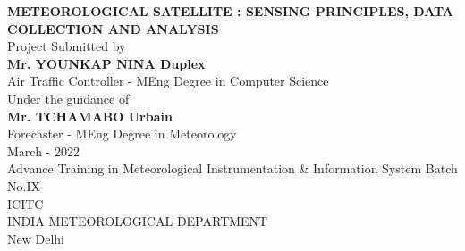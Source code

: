 \documentclass[a4papert,12pt]{report}%
\begin{document}
\begin{center}
	\Large \textbf{ METEOROLOGICAL SATELLITE : SENSING PRINCIPLES, DATA COLLECTION AND ANALYSIS} \vspace{ 1.5 \baselineskip} \normalsize \\	
	
	\Large Project Submitted by \vspace{1 \baselineskip} \normalsize \\
	
	\Large \textbf{ Mr. YOUNKAP NINA Duplex} \vspace{ 0.1\baselineskip} \normalsize \\
	\Large Air Traffic Controller - MEng Degree in Computer Science \vspace{ 1.5 \baselineskip} \normalsize \\
	
	\Large Under the guidance of \vspace{ 1 \baselineskip} \normalsize\\
	\Large \textbf{ Mr. TCHAMABO Urbain }\vspace{ 0.1\baselineskip} \normalsize \\
	\Large Forecaster - MEng Degree in Meteorology \vspace{ 1.5 \baselineskip} \normalsize \\
	
	\Large March - 2022 \vspace{ 1.5 \baselineskip} \normalsize \\
	
	\Large Advance Training in Meteorological Instrumentation \& Information System Batch No.IX \vspace{ 1.5 \baselineskip} \normalsize \\
	
	\Large ICITC \vspace{ 0.1\baselineskip} \normalsize \\
	
	\Large INDIA METEOROLOGICAL DEPARTMENT \vspace{ 0.1\baselineskip} \normalsize \\
	
	\Large New Delhi \vspace{ 0.0\baselineskip} \normalsize \\

	 \end{center}
	

\setcounter{page}{1}
\end{document}
